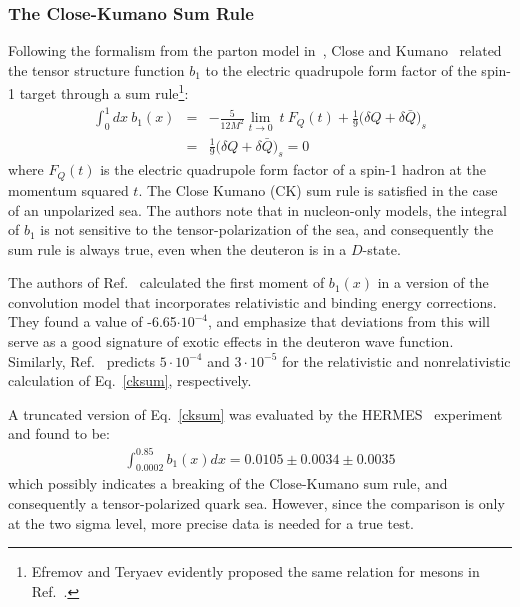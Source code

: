 \subsubsection{The Close-Kumano Sum Rule}
\label{CKSEC}
Following the formalism from the parton model in~\cite{Hoodbhoy:1988am}, Close and
Kumano~\cite{Close:1990zw} related the tensor structure function $b_1$ to the electric quadrupole
form factor of the spin-1 target through a sum rule\footnote{Efremov and Teryaev evidently proposed the same relation for
mesons in Ref.~\cite{Efremov:1981vs}.}:
\begin{eqnarray}
\int_0^1 dx~b_1(x)  & = &  - \frac{5}{12 M^2} \lim_{t \rightarrow 0}~t~F_Q(t)
                           + \frac{1}{9} \Big(\delta Q + \delta \bar{Q}\Big)_s \nonumber \\
                    & = & \frac{1}{9} \Big(\delta Q + \delta \bar{Q}\Big)_s  = 0 
\label{cksum}
\end{eqnarray}
where $F_Q(t)$ is the electric quadrupole form factor of a spin-1 hadron at the momentum squared $t$. 
The Close Kumano (CK) sum rule is satisfied in the case of an unpolarized sea. The authors note
that in nucleon-only models, the integral of $b_1$ is not sensitive to the
tensor-polarization of the sea, and consequently the sum rule is always true, even when the
deuteron is in a $D$-state.

The authors of Ref.~\cite{Khan:1991qk} calculated 
the first moment of $b_1(x)$ in a
version of the convolution model that incorporates relativistic and binding energy corrections.  They found a value of -6.65$\cdot 10^{-4}$, and
emphasize that deviations from this will serve as a good signature of exotic effects in the deuteron wave function.  Similarly, Ref.~\cite{Umnikov:1996qv} predicts $5\cdot 10^{-4}$ and  $3\cdot 10^{-5}$ for the relativistic and nonrelativistic calculation of Eq.~\ref{cksum}, respectively.




A truncated version of Eq.~\ref{cksum} was evaluated by the HERMES~\cite{Riedl:2005jq,Airapetian:2005cb} experiment and found to be:
\begin{eqnarray}
\int_{0.0002}^{0.85} b_1(x) dx = 0.0105 \pm 0.0034 \pm 0.0035
\end{eqnarray}
which possibly indicates a breaking of the Close-Kumano sum rule, and consequently a
tensor-polarized quark sea.  However, since the comparison is only at the two sigma level,  more precise data is needed for a true test.


%


